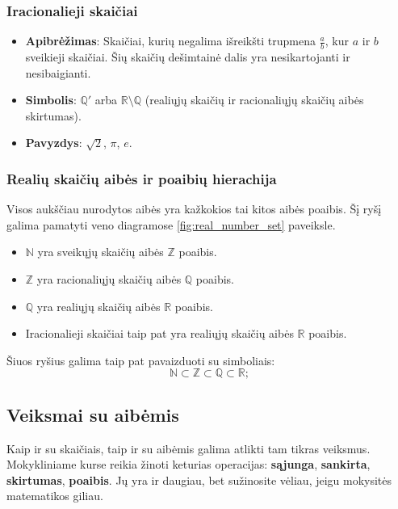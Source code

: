 \documentclass[a4paper]{article}
\begin{document}
\subsubsection{Iracionalieji skaičiai}

\begin{itemize}
      \item \textbf{Apibrėžimas}: Skaičiai, kurių negalima išreikšti trupmena
            $\frac{a}{b}$, kur $a$ ir $b$ sveikieji skaičiai. Šių skaičių
            dešimtainė dalis yra nesikartojanti ir nesibaigianti.
      \item \textbf{Simbolis}: $\mathbb{Q'}$ arba $\mathbb{R} \setminus
                  \mathbb{Q}$ (realiųjų skaičių ir racionaliųjų skaičių aibės
            skirtumas).
      \item \textbf{Pavyzdys}: $\sqrt{2}$, $\pi$, $e$.
\end{itemize}

\subsubsection{Realių skaičių aibės ir poaibių hierachija}
Visos aukščiau nurodytos aibės yra kažkokios tai kitos aibės poaibis. Šį ryšį
galima pamatyti veno diagramose \ref{fig:real_number_set} paveiksle.

\begin{itemize}
      \item $\mathbb{N}$ yra sveikųjų skaičių aibės $\mathbb{Z}$ poaibis.
      \item $\mathbb{Z}$ yra racionaliųjų skaičių aibės $\mathbb{Q}$ poaibis.
      \item $\mathbb{Q}$ yra realiųjų skaičių aibės $\mathbb{R}$ poaibis.
      \item Iracionalieji skaičiai taip pat yra realiųjų skaičių aibės
            $\mathbb{R}$ poaibis.
\end{itemize}

Šiuos ryšius galima taip pat pavaizduoti su simboliais:
\[ \mathbb{N} \subset \mathbb{Z} \subset \mathbb{Q} \subset \mathbb{R}; \]

\subsection{Veiksmai su aibėmis}

Kaip ir su skaičiais, taip ir su aibėmis galima atlikti tam tikras veiksmus.
Mokykliniame kurse reikia žinoti keturias operacijas: \textbf{sąjunga},
\textbf{sankirta}, \textbf{skirtumas}, \textbf{poaibis}. Jų yra ir daugiau, bet
sužinosite vėliau, jeigu mokysitės matematikos giliau.
\end{document}
